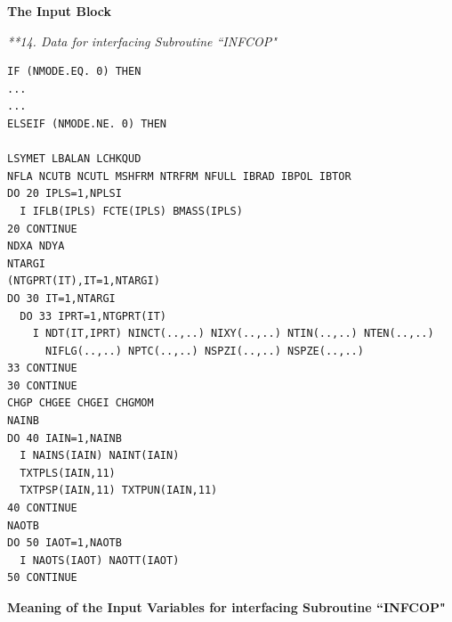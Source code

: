 {\bf The Input Block}

\medskip

\noindent

{\sl ***14. Data for interfacing Subroutine ``INFCOP" }
\begin{verbatim}
IF (NMODE.EQ. 0) THEN
...
...
ELSEIF (NMODE.NE. 0) THEN

LSYMET LBALAN LCHKQUD
NFLA NCUTB NCUTL MSHFRM NTRFRM NFULL IBRAD IBPOL IBTOR
DO 20 IPLS=1,NPLSI
  I IFLB(IPLS) FCTE(IPLS) BMASS(IPLS)
20 CONTINUE
NDXA NDYA
NTARGI
(NTGPRT(IT),IT=1,NTARGI)
DO 30 IT=1,NTARGI
  DO 33 IPRT=1,NTGPRT(IT)
    I NDT(IT,IPRT) NINCT(..,..) NIXY(..,..) NTIN(..,..) NTEN(..,..)
      NIFLG(..,..) NPTC(..,..) NSPZI(..,..) NSPZE(..,..)
33 CONTINUE
30 CONTINUE
CHGP CHGEE CHGEI CHGMOM
NAINB
DO 40 IAIN=1,NAINB
  I NAINS(IAIN) NAINT(IAIN)
  TXTPLS(IAIN,11)
  TXTPSP(IAIN,11) TXTPUN(IAIN,11)
40 CONTINUE
NAOTB
DO 50 IAOT=1,NAOTB
  I NAOTS(IAOT) NAOTT(IAOT)
50 CONTINUE
\end{verbatim}



{\bf Meaning of the Input Variables for interfacing Subroutine
``INFCOP"}

\medskip

\noindent

